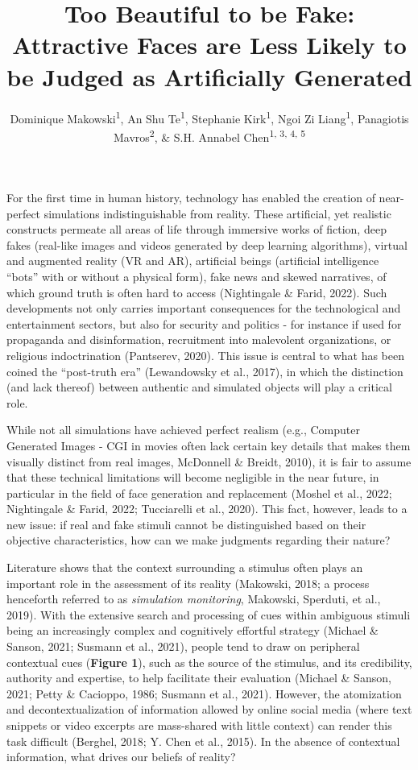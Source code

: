 \documentclass[
  man,floatsintext]{apa6}
\title{\textbf{Too Beautiful to be Fake: Attractive Faces are Less Likely to be Judged as Artificially Generated}}
\author{Dominique Makowski\textsuperscript{1}, An Shu Te\textsuperscript{1}, Stephanie Kirk\textsuperscript{1}, Ngoi Zi Liang\textsuperscript{1}, Panagiotis Mavros\textsuperscript{2}, \& S.H. Annabel Chen\textsuperscript{1, 3, 4, 5}}
\date{}
\affiliation{\vspace{0.5cm}\textsuperscript{1} School of Social Sciences, Nanyang Technological University, Singapore\\\textsuperscript{2} LKC Medicine, Nanyang Technological University, Singapore\\\textsuperscript{3} National Institute of Education, Singapore\\\textsuperscript{4} Centre for Research and Development in Learning, Nanyang Technological University, Singapore}
\begin{document}
\maketitle

For the first time in human history, technology has enabled the creation of near-perfect simulations indistinguishable from reality. These artificial, yet realistic constructs permeate all areas of life through immersive works of fiction, deep fakes (real-like images and videos generated by deep learning algorithms), virtual and augmented reality (VR and AR), artificial beings (artificial intelligence ``bots'' with or without a physical form), fake news and skewed narratives, of which ground truth is often hard to access (Nightingale \& Farid, 2022). Such developments not only carries important consequences for the technological and entertainment sectors, but also for security and politics - for instance if used for propaganda and disinformation, recruitment into malevolent organizations, or religious indoctrination (Pantserev, 2020). This issue is central to what has been coined the ``post-truth era'' (Lewandowsky et al., 2017), in which the distinction (and lack thereof) between authentic and simulated objects will play a critical role.

While not all simulations have achieved perfect realism (e.g., Computer Generated Images - CGI in movies often lack certain key details that makes them visually distinct from real images, McDonnell \& Breidt, 2010), it is fair to assume that these technical limitations will become negligible in the near future, in particular in the field of face generation and replacement (Moshel et al., 2022; Nightingale \& Farid, 2022; Tucciarelli et al., 2020). This fact, however, leads to a new issue: if real and fake stimuli cannot be distinguished based on their objective characteristics, how can we make judgments regarding their nature?

Literature shows that the context surrounding a stimulus often plays an important role in the assessment of its reality (Makowski, 2018; a process henceforth referred to as \emph{simulation monitoring}, Makowski, Sperduti, et al., 2019). With the extensive search and processing of cues within ambiguous stimuli being an increasingly complex and cognitively effortful strategy (Michael \& Sanson, 2021; Susmann et al., 2021), people tend to draw on peripheral contextual cues (\textbf{Figure 1}), such as the source of the stimulus, and its credibility, authority and expertise, to help facilitate their evaluation (Michael \& Sanson, 2021; Petty \& Cacioppo, 1986; Susmann et al., 2021). However, the atomization and decontextualization of information allowed by online social media (where text snippets or video excerpts are mass-shared with little context) can render this task difficult (Berghel, 2018; Y. Chen et al., 2015). In the absence of contextual information, what drives our beliefs of reality?
\end{document}
